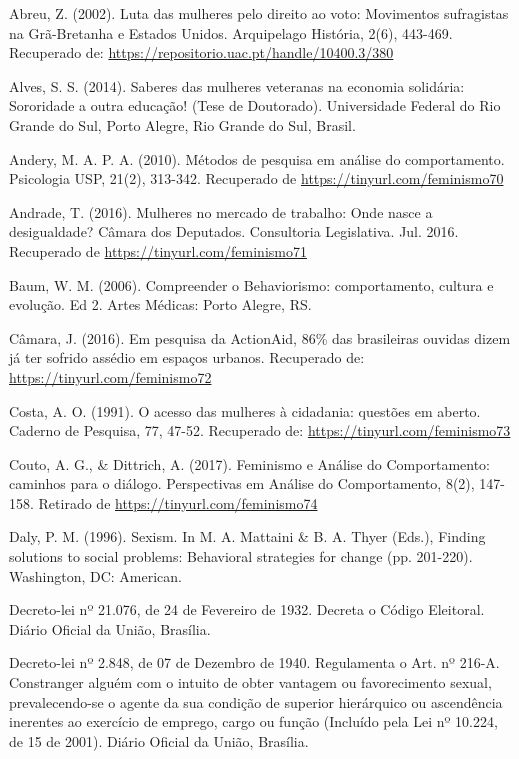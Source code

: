 \hangindent=25pt
\noindent Abreu, Z. (2002). Luta das mulheres pelo direito ao voto: Movimentos sufragistas na Grã-Bretanha e Estados Unidos. Arquipelago História, 2(6), 443-469. Recuperado de: \url{https://repositorio.uac.pt/handle/10400.3/380}

\hangindent=25pt
\noindent Alves, S. S. (2014). Saberes das mulheres veteranas na economia solidária: Sororidade a outra educação! (Tese de Doutorado). Universidade Federal do Rio Grande do Sul, Porto Alegre, Rio Grande do Sul, Brasil.

\hangindent=25pt
\noindent Andery, M. A. P. A. (2010). Métodos de pesquisa em análise do comportamento. Psicologia USP, 21(2), 313-342. Recuperado de \url{https://tinyurl.com/feminismo70}

\hangindent=25pt
\noindent Andrade, T. (2016). Mulheres no mercado de trabalho: Onde nasce a desigualdade? Câmara dos Deputados. Consultoria Legislativa. Jul. 2016. Recuperado de \url{https://tinyurl.com/feminismo71}

\hangindent=25pt
\noindent Baum, W. M. (2006). Compreender o Behaviorismo: comportamento, cultura e evolução. Ed 2. Artes Médicas: Porto Alegre, RS.

\hangindent=25pt
\noindent Câmara, J. (2016). Em pesquisa da ActionAid, 86\% das brasileiras ouvidas dizem já ter sofrido assédio em espaços urbanos. Recuperado de: \url{https://tinyurl.com/feminismo72}

\hangindent=25pt
\noindent Costa, A. O. (1991). O acesso das mulheres à cidadania: questões em aberto. Caderno de Pesquisa, 77, 47-52. Recuperado de: \url{https://tinyurl.com/feminismo73}

\hangindent=25pt
\noindent Couto, A. G., \& Dittrich, A. (2017). Feminismo e Análise do Comportamento: caminhos para o diálogo. Perspectivas em Análise do Comportamento, 8(2), 147-158. Retirado de \url{https://tinyurl.com/feminismo74}

\hangindent=25pt
\noindent Daly, P. M. (1996). Sexism. In M. A. Mattaini \& B. A. Thyer (Eds.), Finding solutions to social problems: Behavioral strategies for change (pp. 201-220). Washington, DC: American.

\hangindent=25pt
\noindent Decreto-lei nº 21.076, de 24 de Fevereiro de 1932. Decreta o Código Eleitoral. Diário Oficial da União, Brasília. 

\hangindent=25pt
\noindent Decreto-lei nº 2.848, de 07 de Dezembro de 1940. Regulamenta o Art. nº 216-A. Constranger alguém com o intuito de obter vantagem ou favorecimento sexual, prevalecendo-se o agente da sua condição de superior hierárquico ou ascendência inerentes ao exercício de emprego, cargo ou função (Incluído pela Lei nº 10.224, de 15 de 2001). Diário Oficial da União, Brasília.

